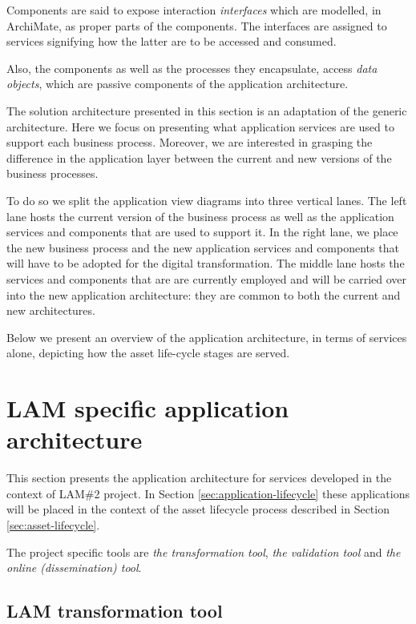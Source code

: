 	Components are said to expose interaction \textit{interfaces} which are modelled, in ArchiMate, as proper parts of the components. The interfaces are assigned to services signifying how the latter are to be accessed and consumed. 
	
	Also, the components as well as the processes they encapsulate, access \textit{data objects}, which are passive components of the application architecture.

	The solution architecture presented in this section is an adaptation of the generic architecture. Here we focus on presenting what application services are used to support each business process. Moreover, we are interested in grasping the difference in the application layer between the current and new versions of the business processes. 
	
	To do so we split the application view diagrams into three vertical lanes. The left lane hosts the current version of the business process as well as the application services and components that are used to support it. In the right lane, we place the new business process and the new application services and components that will have to be adopted for the digital transformation. The middle lane hosts the services and components that are are currently employed and will be carried over into the new application architecture: they are common to both the current and new architectures.

	Below we present an overview of the application architecture, in terms of services alone, depicting how the asset life-cycle stages are served.
	
	\section{LAM specific application architecture}

	This section presents the application architecture for services developed in the context of LAM\#2 project. In Section \ref{sec:application-lifecycle} these applications will be placed in the context of the asset lifecycle process described in Section \ref{sec:asset-lifecycle}. 
	
	The project specific tools are \textit{the transformation tool}, \textit{the validation tool} and \textit{the online (dissemination) tool}.
	
	\subsection{LAM transformation tool}
	\label{sec:transformation-tool}
		
